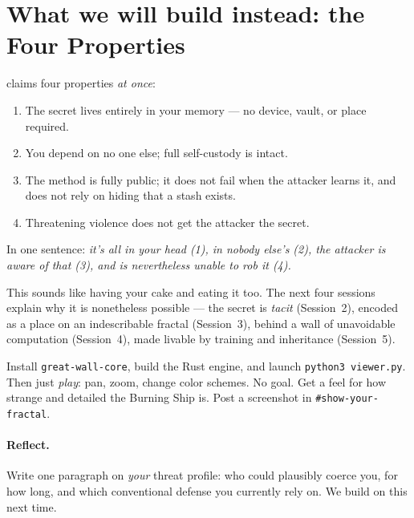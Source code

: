 \documentclass[a4paper,11pt]{report}
\begin{document}
\section{What we will build instead: the Four Properties}
\GW{} claims four properties \emph{at once}:

\begin{enumerate}[leftmargin=1.6em,nosep]
\item {} The secret lives entirely in your
memory — no device, vault, or place required.
\item {} You depend on no one else; full self-custody is
intact.
\item {} The method is fully public; it does not fail when the
attacker learns it, and does not rely on hiding that a stash exists.
\item {} Threatening violence does not get the attacker
the secret.
\end{enumerate}

\begin{keyidea}
In one sentence: \emph{it's all in your head (1), in nobody else's (2), the
attacker is aware of that (3), and is nevertheless unable to rob it (4).}
\end{keyidea}

\noindent This sounds like having your cake and eating it too. The next four
sessions explain why it is nonetheless possible — the secret is \emph{tacit}
(Session~2), encoded as a place on an indescribable fractal (Session~3), behind a
wall of unavoidable computation (Session~4), made livable by training and
inheritance (Session~5).


\begin{tryit}
Install \texttt{great-wall-core}, build the Rust engine, and launch
\texttt{python3 viewer.py}. Then just \emph{play}: pan, zoom, change color
schemes. No goal. Get a feel for how strange and detailed the Burning Ship is.
Post a screenshot in \texttt{\#show-your-fractal}.
\end{tryit}

\paragraph{Reflect.} Write one paragraph on \emph{your} threat profile: who could
plausibly coerce you, for how long, and which conventional defense you currently
rely on. We build on this next time.
\end{document}
